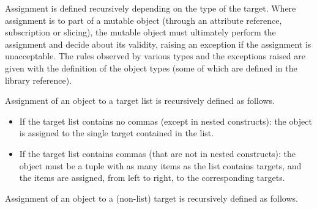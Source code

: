 Assignment is defined recursively depending on the type of the
target.  Where assignment is to part of a mutable object
(through an attribute reference, subscription or slicing),
the mutable object must ultimately perform the
assignment and decide about its validity, raising an exception
if the assignment is unacceptable.  The rules observed by
various types and the exceptions raised are given with the
definition of the object types (some of which are defined
in the library reference).

Assignment of an object to a target list is recursively
defined as follows.

\begin{itemize}
\item
If the target list contains no commas (except in nested constructs):
the object is assigned to the single target contained in the list.

\item
If the target list contains commas (that are not in nested constructs):
the object must be a tuple with as many items
as the list contains targets, and the items are assigned, from left
to right, to the corresponding targets.

\end{itemize}

Assignment of an object to a (non-list)
target is recursively defined as follows.

